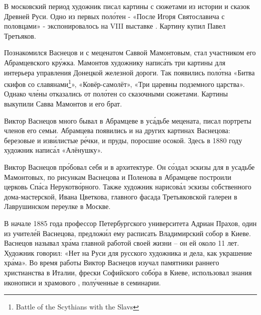 В московский период художник писал картины с сюжетами из истории и сказок Древней Руси. Одно из первых пол\'{о}тен - «После  Игоря Святославича с половцами» -  экспонировалось на VIII выставке . Картину купил Павел Третьяков.

Познакомился Васнецов и с меценатом Саввой Мамонтовым, стал участником его Абрамцевского кр\'{у}жка. Мамонтов  художнику напис\'{а}ть три картины для интерьера управления Донецкой железной дороги. Так появились пол\'{о}тна «Битва скифов со славянами\footnote{Battle of the Scythians with the Slavs}», «Ковёр-самолёт», «Три царевны подземного царства». Однако чл\'{е}ны  отказались от пол\'{о}тен со сказочными сюжетами. Картины выкупили Савва Мамонтов и его брат.

Виктор Васнецов много бывал в Абрамцеве в ус\'{а}дьбе мецената, писал портреты членов его семьи.  Абрамцева появились и на других картинах Васнецова: березовые  и изв\'{и}листые р\'{е}чки,  и пруды, поросшие осокой. Здесь в 1880 году художник напис\'{а}л «Алёнушку».

Виктор Васнецов пр\'{о}бовал себя и в архитектуре. Он с\'{о}здал эскизы для  в усадьбе Мамонтовых, по рисункам Васнецова и Поленова в Абрамцеве построили церковь Сп\'{а}са Нерукотв\'{о}рного. Также художник нарисов\'{а}л эскизы собственного дома-мастерской,  Ивана Цветкова, главного фасада Третьяковской галереи в Лаврушинском переулке в Москве.

В начале 1885 года профессор Петербургского университета Адриан Прахов, один из учител\'{е}й Васнецова, предлож\'{и}л ему расписать  Владимирский собор в Киеве. Васнецов называл  хр\'{а}ма главной работой своей жизни -- он  ей около 11 лет. Художник говорил: «Нет на Руси для русского художника  и  дела, как украшение хр\'{а}ма». Во время работы Виктор Васнецов изучал памятники раннего христианства в Италии, фрески Софийского соб\'{о}ра в Киеве, использовал знания иконописи и храмового , пол\'{у}ченные в семинарии.


